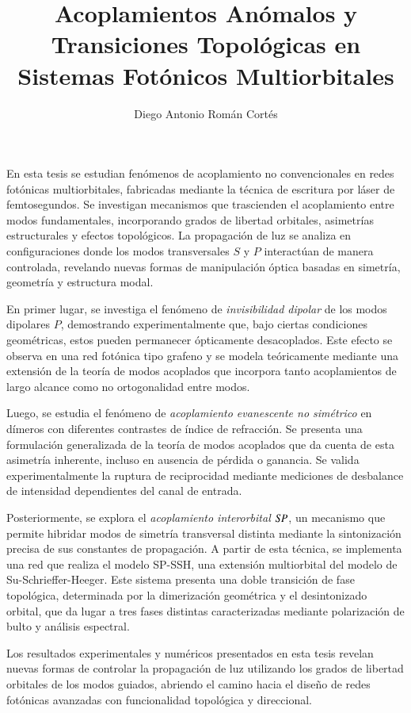 \documentclass[hyphens]{umemoria}
\author{Diego Antonio Román Cortés}
\title{Acoplamientos Anómalos y Transiciones Topológicas en Sistemas Fotónicos Multiorbitales}
\begin{document}
\frontmatter
\maketitle

\begin{resumen}\ignorespacesafterend
	En esta tesis se estudian fenómenos de acoplamiento no convencionales en redes fotónicas multiorbitales, fabricadas mediante la técnica de escritura por láser de femtosegundos. Se investigan mecanismos que trascienden el acoplamiento entre modos fundamentales, incorporando grados de libertad orbitales, asimetrías estructurales y efectos topológicos. La propagación de luz se analiza en configuraciones donde los modos transversales \( S \) y \( P \) interactúan de manera controlada, revelando nuevas formas de manipulación óptica basadas en simetría, geometría y estructura modal.
	
	En primer lugar, se investiga el fenómeno de \textit{invisibilidad dipolar} de los modos dipolares \( P \), demostrando experimentalmente que, bajo ciertas condiciones geométricas, estos pueden permanecer ópticamente desacoplados. Este efecto se observa en una red fotónica tipo grafeno  y se modela teóricamente mediante una extensión de la teoría de modos acoplados que incorpora tanto acoplamientos de largo alcance como no ortogonalidad entre modos.
	
	Luego, se estudia el fenómeno de \textit{acoplamiento evanescente no simétrico} en dímeros con diferentes contrastes de índice de refracción. Se presenta una formulación generalizada de la teoría de modos acoplados que da cuenta de esta asimetría inherente, incluso en ausencia de pérdida o ganancia. Se valida experimentalmente la ruptura de reciprocidad mediante mediciones de desbalance de intensidad dependientes del canal de entrada.
	
	Posteriormente, se explora el \textit{acoplamiento interorbital \( S\hspace{-0.3ex}P \)}, un mecanismo que permite hibridar modos de simetría transversal distinta mediante la sintonización precisa de sus constantes de propagación. A partir de esta técnica, se implementa una red que realiza el modelo SP-SSH, una extensión multiorbital del modelo de Su-Schrieffer-Heeger. Este sistema presenta una doble transición de fase topológica, determinada por la dimerización geométrica y el desintonizado orbital, que da lugar a tres fases distintas caracterizadas mediante polarización de bulto y análisis espectral.
	
	Los resultados experimentales y numéricos presentados en esta tesis revelan nuevas formas de controlar la propagación de luz utilizando los grados de libertad orbitales de los modos guiados, abriendo el camino hacia el diseño de redes fotónicas avanzadas con funcionalidad topológica y direccional.
\end{resumen}
\end{document}
